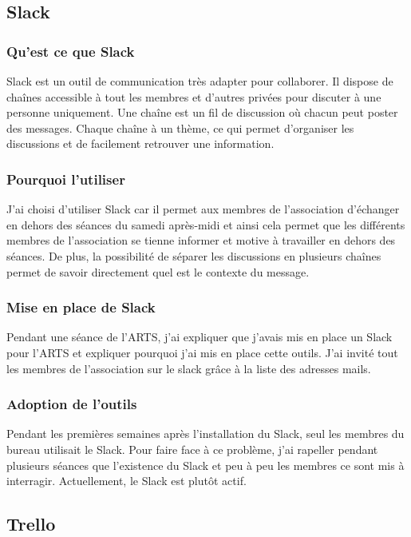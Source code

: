\documentclass[12pt,a4paper]{report}
\begin{document}
    \subsection{Slack}
      \subsubsection{Qu'est ce que Slack}
        Slack est un outil de communication très adapter pour collaborer. Il dispose de chaînes accessible à tout les membres et d'autres privées pour discuter à une personne uniquement. Une chaîne est un fil de discussion où chacun peut poster des messages. Chaque chaîne à un thème, ce qui permet d'organiser les discussions et de facilement retrouver une information.

      \subsubsection{Pourquoi l'utiliser}
        J'ai choisi d'utiliser Slack car il permet aux membres de l'association d'échanger en dehors des séances du samedi après-midi et ainsi cela permet que les différents membres de l'association se tienne informer et motive à travailler en dehors des séances. De plus, la possibilité de séparer les discussions en plusieurs chaînes permet de savoir directement quel est le contexte du message.

      \subsubsection{Mise en place de Slack}
        Pendant une séance de l'ARTS, j'ai expliquer que j'avais mis en place un Slack pour l'ARTS et expliquer pourquoi j'ai mis en place cette outils.
        J'ai invité tout les membres de l'association sur le slack grâce à la liste des adresses mails.

      \subsubsection{Adoption de l'outils}
        Pendant les premières semaines après l'installation du Slack, seul les membres du bureau utilisait le Slack. Pour faire face à ce problème, j'ai rapeller pendant plusieurs séances que l'existence du Slack et peu à peu les membres ce sont mis à interragir.
        Actuellement, le Slack est plut\^ot actif.

    \subsection{Trello}
\end{document}
